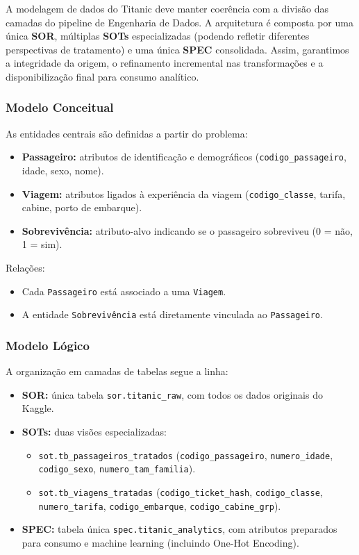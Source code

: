 \documentclass[12pt,a4paper]{article}
\begin{document}
A modelagem de dados do Titanic deve manter coerência com a divisão das camadas do pipeline de Engenharia de Dados. 
A arquitetura é composta por uma única \textbf{SOR}, múltiplas \textbf{SOTs} especializadas (podendo refletir diferentes perspectivas de tratamento) 
e uma única \textbf{SPEC} consolidada. 
Assim, garantimos a integridade da origem, o refinamento incremental nas transformações e a disponibilização final para consumo analítico.

\subsubsection*{Modelo Conceitual}
As entidades centrais são definidas a partir do problema:
\begin{itemize}
    \item \textbf{Passageiro:} atributos de identificação e demográficos (\texttt{codigo\_passageiro}, idade, sexo, nome).
    \item \textbf{Viagem:} atributos ligados à experiência da viagem (\texttt{codigo\_classe}, tarifa, cabine, porto de embarque).
    \item \textbf{Sobrevivência:} atributo-alvo indicando se o passageiro sobreviveu (0 = não, 1 = sim).
\end{itemize}

Relações:
\begin{itemize}
    \item Cada \texttt{Passageiro} está associado a uma \texttt{Viagem}.
    \item A entidade \texttt{Sobrevivência} está diretamente vinculada ao \texttt{Passageiro}.
\end{itemize}

\subsubsection*{Modelo Lógico}
A organização em camadas de tabelas segue a linha:
\begin{itemize}
    \item \textbf{SOR:} única tabela \texttt{sor.titanic\_raw}, com todos os dados originais do Kaggle.
    \item \textbf{SOTs:} duas visões especializadas:
    \begin{itemize}
        \item \texttt{sot.tb\_passageiros\_tratados} (\texttt{codigo\_passageiro}, \texttt{numero\_idade}, \texttt{codigo\_sexo}, \texttt{numero\_tam\_familia}).
        \item \texttt{sot.tb\_viagens\_tratadas} (\texttt{codigo\_ticket\_hash}, \texttt{codigo\_classe}, \texttt{numero\_tarifa}, \texttt{codigo\_embarque}, \texttt{codigo\_cabine\_grp}).
    \end{itemize}
    \item \textbf{SPEC:} tabela única \texttt{spec.titanic\_analytics}, com atributos preparados para consumo e machine learning (incluindo One-Hot Encoding).
\end{itemize}
\end{document}
